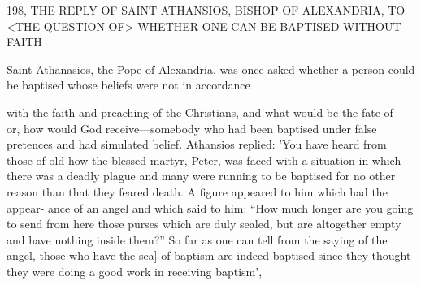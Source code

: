 198, THE REPLY OF SAINT ATHANSIOS,
BISHOP OF ALEXANDRIA,
TO <THE QUESTION OF> WHETHER
ONE CAN BE BAPTISED WITHOUT FAITH

Saint Athanasios, the Pope of Alexandria, was once asked whether
a person could be baptised whose beliefs were not in accordance

with the faith and preaching of the Christians, and what would be
the fate of—or, how would God receive—somebody who had been
baptised under false pretences and had simulated belief.
Athansios
replied: 'You have heard from those of old how the blessed martyr,
Peter, was faced with a situation in which there was a deadly plague
and many were running to be baptised for no other reason than that
they feared death.
A figure appeared to him which had the appear-
ance of an angel and which said to him: “How much longer are you
going to send from here those purses which are duly sealed, but are
altogether empty and have nothing inside them?” So far as one can
tell from the saying of the angel, those who have the sea] of baptism
are indeed baptised since they thought they were doing a good work
in receiving baptism',

